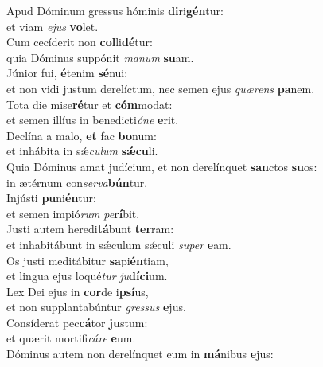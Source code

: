 \evenverse Apud Dóminum gressus hóminis \textbf{di}ri\textbf{gén}tur:~\*\\
\evenverse et viam \textit{e}\textit{jus} \textbf{vo}let.\\
\oddverse Cum cecíderit non \textbf{col}li\textbf{dé}tur:~\*\\
\oddverse quia Dóminus suppónit \textit{ma}\textit{num} \textbf{su}am.\\
\evenverse Júnior fui, \textbf{é}tenim \textbf{sé}nui:~\*\\
\evenverse et non vidi justum derelíctum, nec semen ejus \textit{quæ}\textit{rens} \textbf{pa}nem.\\
\oddverse Tota die mise\textbf{ré}tur et \textbf{cóm}modat:~\*\\
\oddverse et semen illíus in benedicti\textit{ó}\textit{ne} \textbf{e}rit.\\
\evenverse Declína a malo, \textbf{et} fac \textbf{bo}num:~\*\\
\evenverse et inhábita in sǽ\textit{cu}\textit{lum} \textbf{sǽ}\textbf{cu}li.\\
\oddverse Quia Dóminus amat judícium, et non derelínquet \textbf{san}ctos \textbf{su}os:~\*\\
\oddverse in ætérnum con\textit{ser}\textit{va}\textbf{bún}tur.\\
\evenverse Injústi \textbf{pu}ni\textbf{én}tur:~\*\\
\evenverse et semen impió\textit{rum} \textit{pe}\textbf{rí}bit.\\
\oddverse Justi autem heredi\textbf{tá}bunt \textbf{ter}ram:~\*\\
\oddverse et inhabitábunt in sǽculum sǽculi \textit{su}\textit{per} \textbf{e}am.\\
\evenverse Os justi meditábitur \textbf{sa}pi\textbf{én}tiam,~\*\\
\evenverse et lingua ejus loqué\textit{tur} \textit{ju}\textbf{dí}\textbf{ci}um.\\
\oddverse Lex Dei ejus in \textbf{cor}de i\textbf{psí}us,~\*\\
\oddverse et non supplantabúntur \textit{gres}\textit{sus} \textbf{e}jus.\\
\evenverse Consíderat pec\textbf{cá}tor \textbf{ju}stum:~\*\\
\evenverse et quærit mortifi\textit{cá}\textit{re} \textbf{e}um.\\
\oddverse Dóminus autem non derelínquet eum in \textbf{má}nibus \textbf{e}jus:~\*\\
